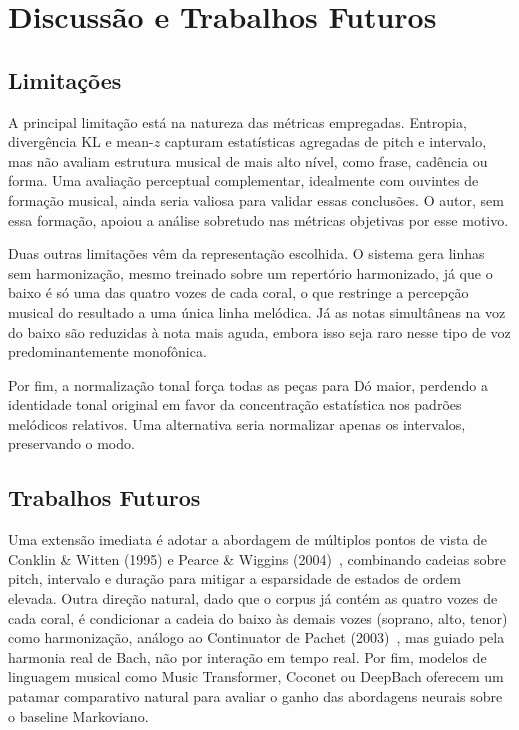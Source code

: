\documentclass{article}
\begin{document}
\section{Discussão e Trabalhos Futuros}\label{sec:discussion}

\subsection{Limitações}

A principal limitação está na natureza das métricas empregadas. Entropia,
divergência KL e mean-$z$ capturam estatísticas agregadas de pitch e intervalo,
mas não avaliam estrutura musical de mais alto nível, como frase, cadência ou
forma. Uma avaliação perceptual complementar, idealmente com ouvintes de
formação musical, ainda seria valiosa para validar essas conclusões. O autor,
sem essa formação, apoiou a análise sobretudo nas métricas objetivas por esse
motivo.

Duas outras limitações vêm da representação escolhida. O sistema gera linhas sem
harmonização, mesmo treinado sobre um repertório harmonizado, já que o baixo é
só uma das quatro vozes de cada coral, o que restringe a percepção musical do
resultado a uma única linha melódica. Já as notas simultâneas na voz do baixo
são reduzidas à nota mais aguda, embora isso seja raro nesse tipo de voz
predominantemente monofônica.

Por fim, a normalização tonal força todas as peças para Dó maior, perdendo a
identidade tonal original em favor da concentração estatística nos padrões
melódicos relativos. Uma alternativa seria normalizar apenas os intervalos,
preservando o modo.

\subsection{Trabalhos Futuros}

Uma extensão imediata é adotar a abordagem de múltiplos pontos de vista de
Conklin \& Witten (1995) e Pearce \& Wiggins
(2004)~\cite{Conklin1995:multiple,Pearce2004:methods}, combinando cadeias sobre
pitch, intervalo e duração para mitigar a esparsidade de estados de ordem
elevada. Outra direção natural, dado que o corpus já contém as quatro vozes de
cada coral, é condicionar a cadeia do baixo às demais vozes (soprano, alto,
tenor) como harmonização, análogo ao Continuator de Pachet
(2003)~\cite{Pachet2003:continuator}, mas guiado pela harmonia real de Bach, não
por interação em tempo real. Por fim, modelos de linguagem musical como Music
Transformer, Coconet ou DeepBach oferecem um patamar comparativo natural para
avaliar o ganho das abordagens neurais sobre o baseline Markoviano.
\end{document}
